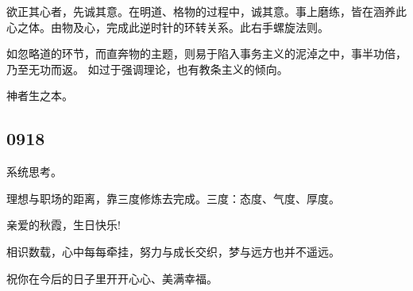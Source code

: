 欲正其心者，先诚其意。在明道、格物的过程中，诚其意。事上磨练，皆在涵养此心之体。由物及心，完成此逆时针的环转关系。此右手螺旋法则。

如忽略道的环节，而直奔物的主题，则易于陷入事务主义的泥淖之中，事半功倍，乃至无功而返。
如过于强调理论，也有教条主义的倾向。

神者生之本。

\subsection{0918}

系统思考。

理想与职场的距离，靠三度修炼去完成。三度：态度、气度、厚度。

亲爱的秋霞，生日快乐!

相识数载，心中每每牵挂，努力与成长交织，梦与远方也并不遥远。

祝你在今后的日子里开开心心、美满幸福。
